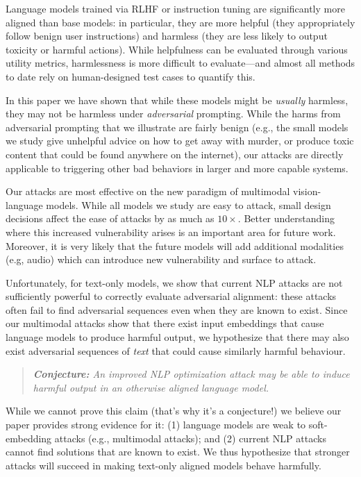 \documentclass{article}
\begin{document}
Language models trained via RLHF or instruction tuning are significantly
more aligned than base models: in particular, they are more helpful
(they appropriately follow benign user instructions) and
harmless (they are less likely to output toxicity or harmful actions).
%
While helpfulness can be evaluated through various utility metrics,
harmlessness is more difficult to evaluate---and almost all methods to
date rely on human-designed test cases to quantify this.

In this paper we have shown that while these models might be \emph{usually}
harmless, they may not be harmless under \emph{adversarial} prompting.
%
While the harms from adversarial prompting that we illustrate are
fairly benign (e.g., the small models we study give unhelpful advice on how to get away with
murder, or produce toxic content that could be found anywhere on the internet),
our attacks are directly applicable to triggering other bad behaviors
in larger and more capable systems.

Our attacks are most effective on the new paradigm of multimodal vision-language models.
While all models we study are easy to attack, small design decisions affect the
ease of attacks by as much as $10\times$.
Better understanding where this increased vulnerability arises is an
important area for future work. 
Moreover, it is very likely that the future models will add additional modalities (e.g, audio) which can introduce new vulnerability and surface to attack.

Unfortunately, for text-only models, we show that current NLP attacks are
not sufficiently powerful to correctly evaluate adversarial alignment:
these attacks often fail to find adversarial sequences even when they are known to exist.
%
Since our multimodal attacks show that there exist
input embeddings that cause language models to produce harmful output,
we hypothesize that there may also exist adversarial sequences of
\emph{text} that could cause similarly harmful behaviour.
%
\begin{quote}
\emph{
\textbf{Conjecture:} 
An improved NLP optimization attack may be able to induce
harmful output in an otherwise aligned language model.
}
\end{quote}
%
While we cannot prove this claim (that's why it's a conjecture!) we believe our
paper provides strong evidence for it:
(1) language models are weak to soft-embedding attacks (e.g., multimodal attacks);
and (2) current NLP attacks cannot find solutions that are known to exist.
%
%
We thus hypothesize that stronger attacks will succeed in making
text-only aligned models behave harmfully.
\end{document}
